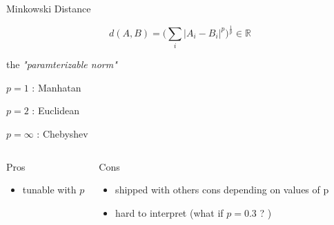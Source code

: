 \documentclass{beamer}
\begin{document}
\begin{frame}{Minkowski Distance}

$$d(A,B)= \big(\sum_i|A_i-B_i|^p\big)^{\frac{1}{p}} \in \mathbb{R}$$


the \textit{"paramterizable norm"}

$p= 1$ : Manhatan

$p= 2$ : Euclidean 

$p = \infty$ : Chebyshev

\begin{scriptsize}
\begin{columns}[T,onlytextwidth]
\begin{block}{Pros}
\begin{itemize}
  \item tunable with $p$ 
\end{itemize}
\end{block}
\begin{block}{Cons}
\begin{spacing}{0.9}
\begin{itemize}
  \item shipped with others cons depending on values of p
  \item hard to interpret (what if $p=0.3$ ? )
\end{itemize}
\end{spacing}
\end{block}
\end{columns}
\end{scriptsize}




\end{frame}
\end{document}
